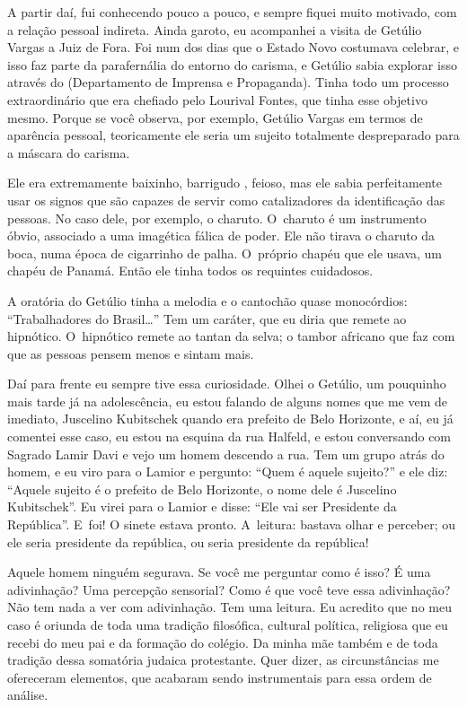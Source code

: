  

A partir daí, fui conhecendo pouco a pouco, e sempre fiquei muito
motivado, com a relação pessoal indireta. Ainda garoto, eu acompanhei a
visita de Getúlio Vargas a Juiz de Fora. Foi num dos dias que o Estado
Novo costumava celebrar, e isso faz parte da parafernália do entorno do
carisma, e Getúlio sabia explorar isso através do  (Departamento de
Imprensa e Propaganda). Tinha todo um processo extraordinário que era
chefiado pelo Lourival Fontes, que tinha esse objetivo mesmo. Porque se
você observa, por exemplo, Getúlio Vargas em termos de aparência
pessoal, teoricamente ele seria um sujeito totalmente despreparado
para a máscara do carisma.

 

Ele era extremamente baixinho, barrigudo , feioso, mas ele sabia
perfeitamente usar os signos que são capazes de servir como
catalizadores da identificação das pessoas. No caso dele, por exemplo, o
charuto. O~charuto é um instrumento óbvio, associado a uma imagética
fálica de poder. Ele não tirava o charuto da boca, numa época de
cigarrinho de palha. O~próprio chapéu que ele usava, um chapéu de
Panamá. Então ele tinha todos os requintes cuidadosos.

 

A oratória do Getúlio tinha a melodia e o cantochão quase monocórdios:
``Trabalhadores do Brasil…'' Tem um caráter, que eu diria que
remete ao hipnótico. O~hipnótico remete ao tantan da selva; o tambor
africano que faz com que as pessoas pensem menos e sintam mais.

 

Daí para frente eu sempre tive essa curiosidade. Olhei o Getúlio, um
pouquinho mais tarde já na adolescência, eu estou falando de alguns
nomes que me vem de imediato, Juscelino Kubitschek quando era prefeito
de Belo Horizonte, e aí, eu já comentei esse caso, eu estou na esquina
da rua Halfeld, e estou conversando com Sagrado Lamir Davi e vejo um
homem descendo a rua. Tem um grupo atrás do homem, e eu viro para o
Lamior e pergunto: ``Quem é aquele sujeito?'' e ele diz: ``Aquele sujeito
é o prefeito de Belo Horizonte, o nome dele é Juscelino Kubitschek''. Eu
virei para o Lamior e disse: ``Ele vai ser Presidente da República''. E~foi! O sinete estava pronto. A~leitura: bastava olhar e perceber; ou ele
seria presidente da república, ou seria presidente da república!

 

Aquele homem ninguém segurava. Se você me perguntar como é isso? É uma
adivinhação? Uma percepção sensorial? Como é que você teve essa
adivinhação? Não tem nada a ver com adivinhação. Tem uma leitura. Eu
acredito que no meu caso é oriunda de toda uma tradição filosófica,
cultural política, religiosa que eu recebi do meu pai e da formação do
colégio. Da minha mãe também e de toda tradição dessa somatória judaica
protestante. Quer dizer, as circunstâncias me ofereceram elementos, que
acabaram sendo instrumentais para essa ordem de análise.

